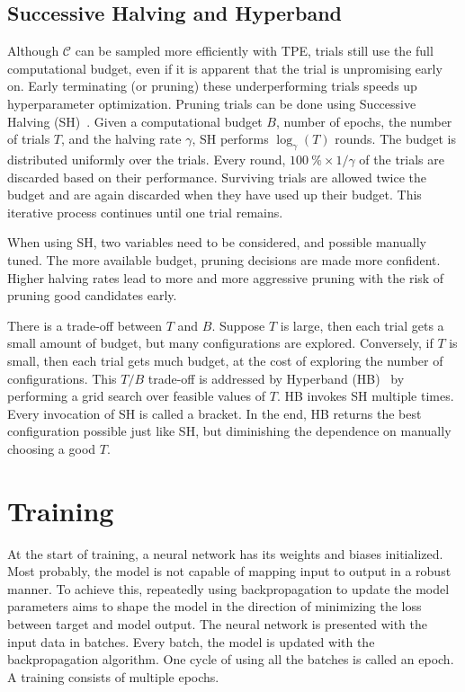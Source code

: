 \subsection{Successive Halving and Hyperband}
Although $\mathcal{C}$ can be sampled more efficiently with TPE, trials still use the full computational budget, even if it is apparent that the trial is unpromising early on.
Early terminating (or pruning) these underperforming trials speeds up hyperparameter optimization.
Pruning trials can be done using Successive Halving (SH)~\cite{Jamieson2016}.
Given a computational budget $B$, \eg number of epochs, the number of trials $T$, and the halving rate $\gamma$, SH performs $\log_\gamma(T)$ rounds.
The budget is distributed uniformly over the trials.
Every round, $\qty{100}{\percent} \times 1/\gamma$ of the trials are discarded based on their performance.
Surviving trials are allowed twice the budget and are again discarded when they have used up their budget.
This iterative process continues until one trial remains.

When using SH, two variables need to be considered, and possible manually tuned.
The more available budget, pruning decisions are made more confident.
Higher halving rates lead to more and more aggressive pruning with the risk of pruning good candidates early.

There is a trade-off between $T$ and $B$.
Suppose $T$ is large, then each trial gets a small amount of budget, but many configurations are explored.
Conversely, if $T$ is small, then each trial gets much budget, at the cost of exploring the number of configurations.
This $T/B$ trade-off is addressed by Hyperband (HB)~\cite{Li2016} by performing a grid search over feasible values of $T$.
HB invokes SH multiple times.
Every invocation of SH is called a bracket.
In the end, HB returns the best configuration possible just like SH, but diminishing the dependence on manually choosing a good $T$.

\section{Training}\label{Training}
At the start of training, a neural network has its weights and biases initialized.
Most probably, the model is not capable of mapping input to output in a robust manner.
To achieve this, repeatedly using backpropagation to update the model parameters aims to shape the model in the direction of minimizing the loss between target and model output.
The neural network is presented with the input data in batches.
Every batch, the model is updated with the backpropagation algorithm.
One cycle of using all the batches is called an epoch.
A training consists of multiple epochs.

